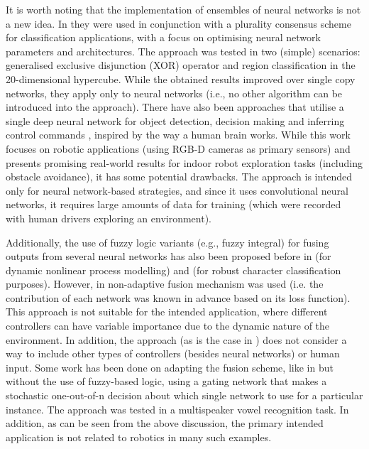 It is worth noting that the implementation of ensembles of neural networks is not a new idea. In \cite{Hansen1990} they were used in conjunction with a plurality consensus scheme for classification applications, with a focus on optimising neural network parameters and architectures. The approach was tested in two (simple) scenarios: generalised exclusive disjunction (XOR) operator and region classification in the 20-dimensional hypercube. While the obtained results improved over single copy networks, they apply only to neural networks (i.e., no other algorithm can be introduced into the approach). There have also been approaches that utilise a single deep neural network for object detection, decision making and inferring control commands \cite{Tai2017}, inspired by the way a human brain works. While this work focuses on robotic applications (using RGB-D cameras as primary sensors) and presents promising real-world results for indoor robot exploration tasks (including obstacle avoidance), it has some potential drawbacks. The approach \cite{Tai2017} is intended only for neural network-based strategies, and since it uses convolutional neural networks, it requires large amounts of data for training (which were recorded with human drivers exploring an environment).

Additionally, the use of fuzzy logic variants (e.g., fuzzy integral) for fusing outputs from several neural networks has also been proposed before in \cite{Cho1995} (for dynamic nonlinear process modelling) and \cite{Ahmad2005} (for robust character classification purposes). However, in \cite{Ahmad2005} non-adaptive fusion mechanism was used (i.e. the contribution of each network was known in advance based on its loss function). This approach is not suitable for the intended application, where different controllers can have variable importance due to the dynamic nature of the environment. In addition, the approach (as is the case in \cite{Cho1995}) does not consider a way to include other types of controllers (besides neural networks) or human input. Some work has been done on adapting the fusion scheme, like in \cite{Jacobs1991} but without the use of fuzzy-based logic, using a gating network that makes a stochastic one-out-of-n decision about which single network to use for a particular instance. The approach was tested in a multispeaker vowel recognition task. In addition, as can be seen from the above discussion, the primary intended application is not related to robotics in many such examples.

